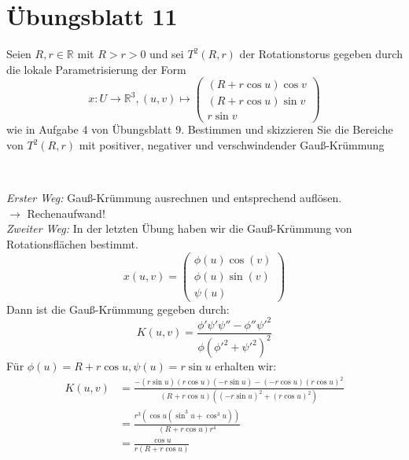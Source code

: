 \section{Übungsblatt 11}
\setcounter{problemcounter}{0}

\begin{assignment}
  Seien \( R, r \in \mathbb{R} \) mit \( R > r > 0 \) und sei \( T^2(R,r) \) der Rotationstorus gegeben durch die lokale Parametrisierung der Form
  \begin{equation*}
    x: U \to \mathbb{R}^3, (u,v) \mapsto \begin{pmatrix}
      (R + r\cos u) \cos v \\
      (R + r\cos u) \sin v \\
      r \sin v
    \end{pmatrix}
  \end{equation*}
  wie in Aufgabe 4 von Übungsblatt 9. Bestimmen und skizzieren Sie die Bereiche von \( T^2(R,r) \) mit positiver, negativer und verschwindender Gauß-Krümmung 
\end{assignment}
\begin{solution}
  \
\end{solution}
\emph{Erster Weg:} Gauß-Krümmung ausrechnen und entsprechend auflösen. \\
\( \rightarrow \) Rechenaufwand! \\
\emph{Zweiter Weg:} In der letzten Übung haben wir die Gauß-Krümmung von Rotationsflächen bestimmt.
\begin{equation*}
  x(u,v) = \begin{pmatrix}
    \phi(u) \cos(v) \\
    \phi(u) \sin(v) \\
    \psi(u) 
  \end{pmatrix}
\end{equation*}
Dann ist die Gauß-Krümmung gegeben durch: 
\begin{equation*} 
  K(u,v) = \frac{\phi' \psi' \psi'' - \phi'' \psi'^2}{\phi(\phi'^2 + \psi'^2)^2}
\end{equation*}
Für \( \phi(u) = R + r \cos u, \psi(u) = r \sin u \) erhalten wir:
\begin{align*}
  K(u,v) &= \frac{-(r \sin u)(r \cos u)(-r \sin u)-(-r \cos u){(r \cos u)}^2}{(R+r \cos u)({(-r \sin u)}^2 + {(r \cos u)}^2)} \\
  &= \frac{r^3(\cos u(\sin^3u + \cos^3 u))}{ (R + r \cos u) r^4} \\
  &= \frac{\cos u}{r(R+r \cos u)} 
\end{align*}

